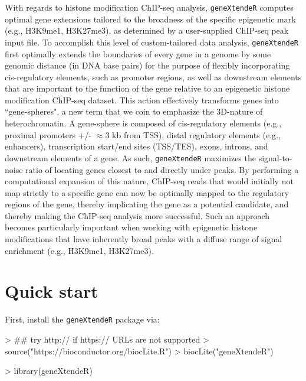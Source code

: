 \documentclass[12pt]{article}
\begin{document}
With regards to histone modification ChIP-seq analysis, \texttt{geneXtendeR} computes optimal gene extensions tailored to the broadness of the specific epigenetic mark (e.g., H3K9me1, H3K27me3), as determined by a user-supplied ChIP-seq peak input file.  To accomplish this level of custom-tailored data analysis, \texttt{geneXtendeR} first optimally extends the boundaries of every gene in a genome by some genomic distance (in DNA base pairs) for the purpose of flexibly incorporating cis-regulatory elements, such as promoter regions, as well as downstream elements that are important to the function of the gene relative to an epigenetic histone modification ChIP-seq dataset.  This action effectively transforms genes into ``gene-spheres", a new term that we coin to emphasize the 3D-nature of heterochromatin.  A gene-sphere is composed of cis-regulatory elements (e.g., proximal promoters +/- $\approx 3$ kb from TSS), distal regulatory elements (e.g., enhancers), transcription start/end sites (TSS/TES), exons, introns, and downstream elements of a gene.  As such, \texttt{geneXtendeR} maximizes the signal-to-noise ratio of locating genes closest to and directly under peaks. By performing a computational expansion of this nature, ChIP-seq reads that would initially not map strictly to a specific gene can now be optimally mapped to the regulatory regions of the gene, thereby implicating the gene as a potential candidate, and thereby making the ChIP-seq analysis more successful. Such an approach becomes particularly important when working with epigenetic histone modifications that have inherently broad peaks with a diffuse range of signal enrichment (e.g., H3K9me1, H3K27me3). 


\section*{Quick start}

First, install the \texttt{geneXtendeR} package via:

\begin{Schunk}
\begin{Sinput}
> ## try http:// if https:// URLs are not supported
> source("https://bioconductor.org/biocLite.R")
> biocLite("geneXtendeR")
\end{Sinput}
\end{Schunk}

\begin{Schunk}
\begin{Sinput}
> library(geneXtendeR)
\end{Sinput}
\end{Schunk}
\end{document}
